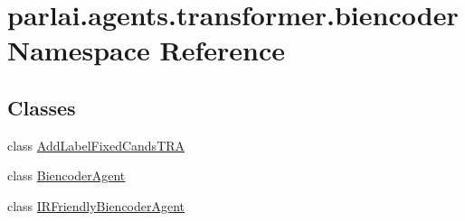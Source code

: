 \hypertarget{namespaceparlai_1_1agents_1_1transformer_1_1biencoder}{}\section{parlai.\+agents.\+transformer.\+biencoder Namespace Reference}
\label{namespaceparlai_1_1agents_1_1transformer_1_1biencoder}
\subsection*{Classes}
\begin{DoxyCompactItemize}
\item 
class \hyperlink{classparlai_1_1agents_1_1transformer_1_1biencoder_1_1AddLabelFixedCandsTRA}{Add\+Label\+Fixed\+Cands\+T\+RA}
\item 
class \hyperlink{classparlai_1_1agents_1_1transformer_1_1biencoder_1_1BiencoderAgent}{Biencoder\+Agent}
\item 
class \hyperlink{classparlai_1_1agents_1_1transformer_1_1biencoder_1_1IRFriendlyBiencoderAgent}{I\+R\+Friendly\+Biencoder\+Agent}
\end{DoxyCompactItemize}
